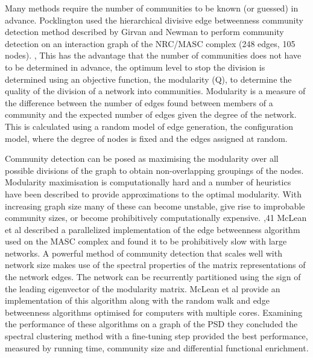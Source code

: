 Many methods require the number of communities to be known (or guessed) in advance. Pocklington used the hierarchical divisive edge betweenness community detection method described by Girvan and Newman to perform community detection on an interaction graph of the NRC/MASC complex (248 edges, 105 nodes). \cite{pocklington2006proteomes},\cite{girvan2002community}  This has the advantage that the number of communities does not have to be determined in advance, the optimum level to stop the division is determined using an objective function, the modularity (Q), to determine the quality of the division of a network into communities. \cite{girvan2002community}  Modularity is a measure of the difference between the number of edges found between members of a community and the expected number of edges given the degree of the network. This is calculated using a random model of edge generation, the configuration model, where the degree of nodes is fixed and the edges assigned at random. \cite{fortunato2016community} 

Community detection can be posed as maximising the modularity over all possible divisions of the graph to obtain non-overlapping groupings of the nodes. \cite{newman2013spectral}  Modularity maximisation is computationally hard and a number of heuristics have been described to provide approximations to the optimal modularity. \cite{newman2013spectral} With increasing graph size many of these can become unstable, give rise to improbable community sizes, or become prohibitively computationally expensive. \cite{pocklington2006proteomes},41  
McLean et al \cite{mclean2016improved}  described a parallelized implementation of the edge betweenness algorithm used on the MASC complex   and found it to be prohibitively slow with large networks.  A powerful method of community detection that scales well with network size makes use of the spectral properties of the matrix representations of the network edges. \cite{newman2013spectral}  The network can be recurrently partitioned using the sign of the leading eigenvector of the modularity matrix. \cite{newman2013spectral}  McLean et al \cite{mclean2016improved} provide an implementation of this algorithm along with the random walk and edge betweenness algorithms optimised for computers with multiple cores. Examining the performance of these algorithms on a graph of the PSD they concluded the spectral clustering method with a fine-tuning step provided the best performance, measured by running time, community size and differential functional enrichment. 

